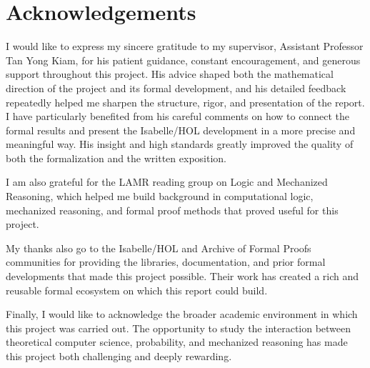 \chapter*{Acknowledgements}

I would like to express my sincere gratitude to my supervisor, Assistant Professor Tan Yong Kiam, for his patient guidance, constant encouragement, and generous support throughout this project.
His advice shaped both the mathematical direction of the project and its formal development, and his detailed feedback repeatedly helped me sharpen the structure, rigor, and presentation of the report.
I have particularly benefited from his careful comments on how to connect the formal results and present the Isabelle/HOL development in a more precise and meaningful way.
His insight and high standards greatly improved the quality of both the formalization and the written exposition.

I am also grateful for the LAMR reading group on Logic and Mechanized Reasoning, which helped me build background in computational logic, mechanized reasoning, and formal proof methods that proved useful for this project.

My thanks also go to the Isabelle/HOL and Archive of Formal Proofs communities for providing the libraries, documentation, and prior formal developments that made this project possible.
Their work has created a rich and reusable formal ecosystem on which this report could build.

Finally, I would like to acknowledge the broader academic environment in which this project was carried out.
The opportunity to study the interaction between theoretical computer science, probability, and mechanized reasoning has made this project both challenging and deeply rewarding.


